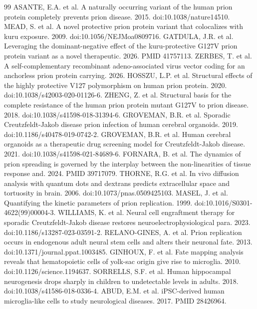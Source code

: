 \documentclass[12pt,a4paper,oneside]{report}
\begin{document}
\begin{thebibliography}{99}\setlength{\itemsep}{1pt}
 ASANTE, E.A. et al. A naturally occurring variant of the human prion protein completely prevents prion disease. 2015. doi:10.1038/nature14510.
 MEAD, S. et al. A novel protective prion protein variant that colocalizes with kuru exposure. 2009. doi:10.1056/NEJMoa0809716.
 GATDULA, J.R. et al. Leveraging the dominant-negative effect of the kuru-protective G127V prion protein variant as a novel therapeutic. 2026. PMID 41757113.
 ZERBES, T. et al. A self-complementary recombinant adeno-associated virus vector coding for an anchorless prion protein carrying. 2026.
 HOSSZU, L.P. et al. Structural effects of the highly protective V127 polymorphism on human prion protein. 2020. doi:10.1038/s42003-020-01126-6.
 ZHENG, Z. et al. Structural basis for the complete resistance of the human prion protein mutant G127V to prion disease. 2018. doi:10.1038/s41598-018-31394-6.
 GROVEMAN, B.R. et al. Sporadic Creutzfeldt-Jakob disease prion infection of human cerebral organoids. 2019. doi:10.1186/s40478-019-0742-2.
 GROVEMAN, B.R. et al. Human cerebral organoids as a therapeutic drug screening model for Creutzfeldt-Jakob disease. 2021. doi:10.1038/s41598-021-84689-6.
 FORNARA, B. et al. The dynamics of prion spreading is governed by the interplay between the non-linearities of tissue response and. 2024. PMID 39717079.
 THORNE, R.G. et al. In vivo diffusion analysis with quantum dots and dextrans predicts extracellular space and tortuosity in brain. 2006. doi:10.1073/pnas.0509425103.
 MASEL, J. et al. Quantifying the kinetic parameters of prion replication. 1999. doi:10.1016/S0301-4622(99)00004-3.
 WILLIAMS, K. et al. Neural cell engraftment therapy for sporadic Creutzfeldt-Jakob disease restores neuroelectrophysiological para. 2023. doi:10.1186/s13287-023-03591-2.
 RELANO-GINES, A. et al. Prion replication occurs in endogenous adult neural stem cells and alters their neuronal fate. 2013. doi:10.1371/journal.ppat.1003485.
 GINHOUX, F. et al. Fate mapping analysis reveals that hematopoietic cells of yolk-sac origin give rise to microglia. 2010. doi:10.1126/science.1194637.
 SORRELLS, S.F. et al. Human hippocampal neurogenesis drops sharply in children to undetectable levels in adults. 2018. doi:10.1038/s41586-018-0336-4.
 ABUD, E.M. et al. iPSC-derived human microglia-like cells to study neurological diseases. 2017. PMID 28426964.

\end{thebibliography}
\end{document}

